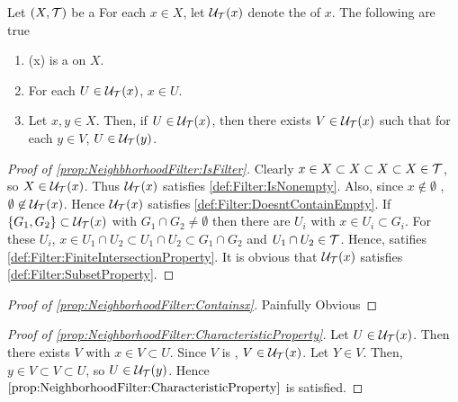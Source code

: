 \begin{prop}
\label{prop:NeighborhoodFilter}
Let $(X,\mathcal{T})$ be a \TopologicalSpace 
For each $x \in X$, 
let $\mathcal{U}_{\mathcal{T}}(x)$ denote the 
\NeighborhoodFilter of $x$.
The following are true 
\begin{enumerate}[label=(\roman*), ref={\ref{prop:NeighborhoodFilter}~\roman*}]
\item \label{prop:NeighbhorhoodFilter:IsFilter} \NeighborhoodFilterInstance{\T}(x) is a \Filter on $X$. 
\item \label{prop:NeighborhoodFilter:Containsx} For each $U \in \mathcal{U}_{\mathcal{T}}(x)$, $x \in U$. 
\item \label{prop:NeighborhoodFilter:CharacteristicProperty} 
Let $x,y \in X$. Then, if $U \in \mathcal{U}_{\mathcal{T}}(x)$, then there exists 
$V \in \mathcal{U}_{\mathcal{T}}(x)$ such that for each $y \in V$, $U \in \mathcal{U}_{\mathcal{T}}(y)$. 
\end{enumerate}
\begin{proof}[Proof of \ref{prop:NeighbhorhoodFilter:IsFilter}]
Clearly $x \in X \subset X \subset X \subset X \in \mathcal{T}$, so $X \in \mathcal{U}_{\mathcal{T}}(x)$. 
Thus $\mathcal{U}_{\mathcal{T}}(x)$ satisfies \ref{def:Filter:IsNonempty}. 
Also, since $x \not \in \emptyset$
, $\emptyset \not \in\mathcal{U}_{\mathcal{T}}(x)$.
Hence $\mathcal{U}_{\mathcal{T}}(x)$ satisfies \ref{def:Filter:DoesntContainEmpty}.
If $\{G_1, G_2\} \subset \mathcal{U}_{\mathcal{T}}(x)$ with 
$G_1 \cap G_2 \neq \emptyset$
then there are \SetOpen $U_i$ with $x \in U_i \subset G_i$.
For these $U_i$, 
$x \in U_1 \cap U_2 \subset U_1 \cap U_2 \subset G_1 \cap G_2$ and $U_1 \cap U_2 \in \mathcal{T}$. 
Hence, \NeighborhoodFilterInstance{\T} satifies
\ref{def:Filter:FiniteIntersectionProperty}.
It is obvious that $\mathcal{U}_{\mathcal{T}}(x)$ satisfies
\ref{def:Filter:SubsetProperty}. 
\end{proof}
\begin{proof}[Proof of \ref{prop:NeighborhoodFilter:Containsx}]
Painfully Obvious
\end{proof}
\begin{proof}[Proof of \ref{prop:NeighborhoodFilter:CharacteristicProperty}]
Let $U \in \mathcal{U}_{\mathcal{T}}(x)$. 
Then there exists \SetOpen $V$ with $x \in V \subset U$. 
Since $V$ is \SetOpen, $V \in \mathcal{U}_{\mathcal{T}}(x)$. 
Let $Y \in V$. Then, $y \in V \subset V \subset U$, so $U \in \mathcal{U}_{\mathcal{T}}(y)$. 
Hence $\ref{prop:NeighborhoodFilter:CharacteristicProperty}$ is satisfied. 
\end{proof}
\end{prop}

